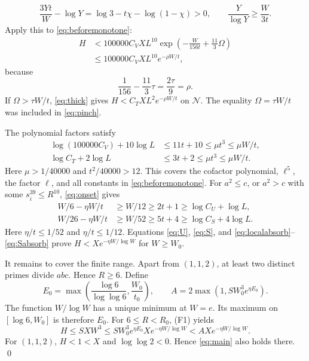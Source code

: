 \documentclass{amsart}
\theoremstyle{remark}
\numberwithin{equation}{section}
\begin{document}
\[
\frac{3Yt}{W}-\log Y=\log3-t\chi-\log(1-\chi)>0,
\qquad \frac Y{\log Y}\ge\frac W{3t}.
\]
Apply this to \eqref{eq:beforemonotone}:
\begin{equation}\label{eq:pinch}
\begin{split}
H&<100000C_VXL^{10}\exp\!\left(-\frac W{156t}+\frac{11}3\Omega\right)\\
 &\le100000C_VXL^{10}e^{-\rho W/t},
\end{split}
\end{equation}
because
\begin{equation}\label{eq:balance}
\frac1{156}-\frac{11}3\tau=\frac{2\tau}9=\rho.
\end{equation}
If $\Omega>\tau W/t$, \eqref{eq:thick} gives
$H<C_T XL^2e^{-\rho W/t}$ on $\mathcal N$.
The equality $\Omega=\tau W/t$ was included in \eqref{eq:pinch}.

The polynomial factors satisfy
\begin{align}
\log(100000C_V)+10\log L&\le11t+10\le\mu t^3\le\mu W/t,\label{eq:localabsorb}\\
\log C_T+2\log L&\le3t+2\le\mu t^3\le\mu W/t.\label{eq:thickabsorb}
\end{align}
Here $\mu>1/40000$ and $t^2/40000>12$.
This covers the cofactor polynomial, $\ell^5$, the factor $\ell$,
and all constants in \eqref{eq:beforemonotone}.
For $a^2\le c$, or $a^2>c$ with some $s_i^{39}\le R^{10}$,
\eqref{eq:onset} gives
\begin{align}
W/6-\eta W/t&\ge W/12\ge2t+1\ge\log C_U+\log L,\label{eq:Uabsorb}\\
W/26-\eta W/t&\ge W/52\ge5t+4\ge\log C_S+4\log L.\label{eq:Sabsorb}
\end{align}
Here $\eta/t\le1/52$ and $\eta/t\le1/12$.
Equations \eqref{eq:U}, \eqref{eq:S}, and
\eqref{eq:localabsorb}--\eqref{eq:Sabsorb} prove
$H<Xe^{-\eta W/\log W}$ for $W\ge W_0$.

It remains to cover the finite range.
Apart from $(1,1,2)$, at least two distinct primes divide $abc$.
Hence $R\ge6$.
Define
\begin{equation}\label{eq:A}
E_0=\max\left(\frac{\log6}{\log\log6},\frac{W_0}{t_0}\right),\qquad
A=2\max\left(1,S W_0^3e^{\eta E_0}\right).
\end{equation}
The function $W/\log W$ has a unique minimum at $W=e$.
Its maximum on $[\log6,W_0]$ is therefore $E_0$.
For $6\le R<R_0$, (F1) yields
\[
H\le SXW^3\le S W_0^3e^{\eta E_0}Xe^{-\eta W/\log W}
 <AXe^{-\eta W/\log W}.
\]
For $(1,1,2)$, $H<1<X$ and $\log\log2<0$.
Hence \eqref{eq:main} also holds there.
\qed
\end{document}
